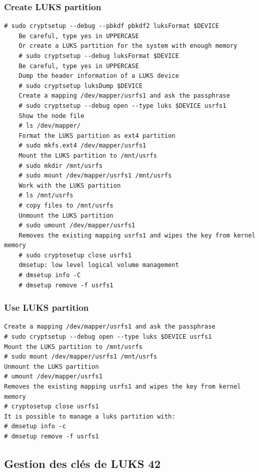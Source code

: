 \documentclass[resume]{subfiles}
\begin{document}
\subsubsection{Create LUKS partition}
\begin{lstlisting}[style=console,label={},caption={}]
	# sudo cryptsetup --debug --pbkdf pbkdf2 luksFormat $DEVICE
	Be careful, type yes in UPPERCASE
	Or create a LUKS partition for the system with enough memory
	# sudo cryptsetup --debug luksFormat $DEVICE
	Be careful, type yes in UPPERCASE
	Dump the header information of a LUKS device
	# sudo cryptsetup luksDump $DEVICE
	Create a mapping /dev/mapper/usrfs1 and ask the passphrase
	# sudo cryptsetup --debug open --type luks $DEVICE usrfs1
	Show the node file
	# ls /dev/mapper/
	Format the LUKS partition as ext4 partition
	# sudo mkfs.ext4 /dev/mapper/usrfs1
	Mount the LUKS partition to /mnt/usrfs
	# sudo mkdir /mnt/usrfs
	# sudo mount /dev/mapper/usrfs1 /mnt/usrfs
	Work with the LUKS partition
	# ls /mnt/usrfs
	# copy files to /mnt/usrfs
	Unmount the LUKS partition
	# sudo umount /dev/mapper/usrfs1
	Removes the existing mapping usrfs1 and wipes the key from kernel memory
	# sudo cryptosetup close usrfs1
	dmsetup: low level logical volume management
	# dmsetup info -C
	# dmsetup remove -f usrfs1
\end{lstlisting}

\subsubsection{Use LUKS partition}
\begin{lstlisting}[style=console,label={},caption={}]
Create a mapping /dev/mapper/usrfs1 and ask the passphrase
# sudo cryptsetup --debug open --type luks $DEVICE usrfs1
Mount the LUKS partition to /mnt/usrfs
# sudo mount /dev/mapper/usrfs1 /mnt/usrfs
Unmount the LUKS partition
# umount /dev/mapper/usrfs1
Removes the existing mapping usrfs1 and wipes the key from kernel memory
# cryptosetup close usrfs1
It is possible to manage a luks partition with:
# dmsetup info -c
# dmsetup remove -f usrfs1
\end{lstlisting}


\subsection{Gestion des clés de LUKS 42}
\end{document}
